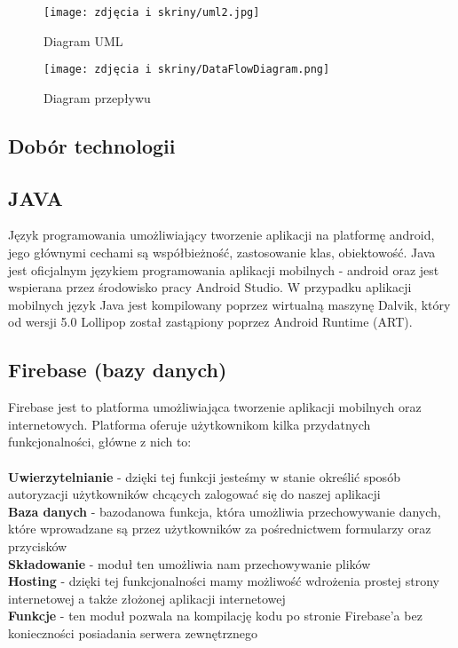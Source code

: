 \documentclass[12pt,a4paper]{article}
\begin{document}
\begin{figure}[h]
\centering
\texttt{[image: zdjęcia i skriny/uml2.jpg]}
\caption{Diagram UML}
\end{figure}
\begin{figure}[h]
\centering
\texttt{[image: zdjęcia i skriny/DataFlowDiagram.png]}
\caption{Diagram przepływu}
\end{figure}
\newpage
\subsection{Dobór technologii}

\subsection*{\center\textbf{JAVA}}
\hspace{10mm}Język programowania umożliwiający tworzenie aplikacji na platformę android\cite{java1}, jego głównymi cechami są współbieżność, zastosowanie klas, obiektowość. Java jest oficjalnym językiem programowania aplikacji mobilnych - android oraz jest wspierana przez środowisko pracy Android Studio. W przypadku aplikacji mobilnych język Java jest kompilowany poprzez wirtualną maszynę Dalvik, który od wersji 5.0 Lollipop został zastąpiony poprzez Android Runtime (ART)\cite{java2}.

\subsection*{\center\textbf{Firebase (bazy danych)}}
\hspace{10mm}Firebase jest to platforma umożliwiająca tworzenie aplikacji mobilnych oraz internetowych.  \cite{firebase}
Platforma oferuje użytkownikom kilka przydatnych funkcjonalności, główne z nich to:\\
\\
\textbf{Uwierzytelnianie} - dzięki tej funkcji jesteśmy w stanie określić sposób autoryzacji użytkowników chcących zalogować się do naszej aplikacji \\
\textbf{Baza danych} - bazodanowa funkcja, która umożliwia przechowywanie danych, które wprowadzane są przez użytkowników za pośrednictwem formularzy oraz przycisków \\
\textbf{Składowanie} - moduł ten umożliwia nam przechowywanie plików \\
\textbf{Hosting} - dzięki tej funkcjonalności mamy możliwość wdrożenia prostej strony internetowej a także złożonej aplikacji internetowej    \\
\textbf{Funkcje} - ten moduł pozwala na kompilację kodu po stronie Firebase’a bez konieczności posiadania serwera zewnętrznego  
\end{document}
